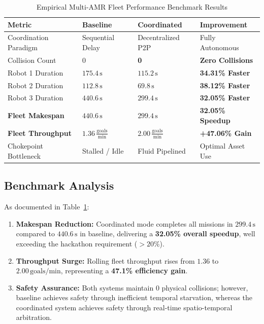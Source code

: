 \documentclass[10pt,twocolumn,a4paper]{article}
\theoremstyle{definition}
\begin{document}
\begin{table}[t]
\centering
\caption{Empirical Multi-AMR Fleet Performance Benchmark Results}
\label{tab:benchmark_results}
\small
\begin{tabularx}{\columnwidth}{lXXX}
\toprule
\textbf{Metric} & \textbf{Baseline} & \textbf{Coordinated} & \textbf{Improvement} \\
\midrule
Coordination Paradigm & Sequential Delay & Decentralized P2P & Fully Autonomous \\
Collision Count & 0 & \textbf{0} & \textbf{Zero Collisions} \\
Robot 1 Duration & $175.4\,\text{s}$ & \textbf{$115.2\,\text{s}$} & \textbf{34.31\% Faster} \\
Robot 2 Duration & $112.8\,\text{s}$ & \textbf{$69.8\,\text{s}$} & \textbf{38.12\% Faster} \\
Robot 3 Duration & $440.6\,\text{s}$ & \textbf{$299.4\,\text{s}$} & \textbf{32.05\% Faster} \\
\midrule
\textbf{Fleet Makespan} & $440.6\,\text{s}$ & \textbf{$299.4\,\text{s}$} & \textbf{32.05\% Speedup} \\
\textbf{Fleet Throughput} & $1.36\,\frac{\text{goals}}{\text{min}}$ & \textbf{$2.00\,\frac{\text{goals}}{\text{min}}$} & \textbf{+47.06\% Gain} \\
Chokepoint Bottleneck & Stalled / Idle & Fluid Pipelined & Optimal Asset Use \\
\bottomrule
\end{tabularx}
\end{table}

\subsection{Benchmark Analysis}
As documented in Table~\ref{tab:benchmark_results}:
\begin{enumerate}
    \item \textbf{Makespan Reduction:} Coordinated mode completes all missions in $299.4\,\text{s}$ compared to $440.6\,\text{s}$ in baseline, delivering a \textbf{32.05\% overall speedup}, well exceeding the hackathon requirement ($>20\%$).
    \item \textbf{Throughput Surge:} Rolling fleet throughput rises from $1.36$ to $2.00\,\text{goals/min}$, representing a \textbf{47.1\% efficiency gain}.
    \item \textbf{Safety Assurance:} Both systems maintain 0 physical collisions; however, baseline achieves safety through inefficient temporal starvation, whereas the coordinated system achieves safety through real-time spatio-temporal arbitration.
\end{enumerate}
\end{document}
